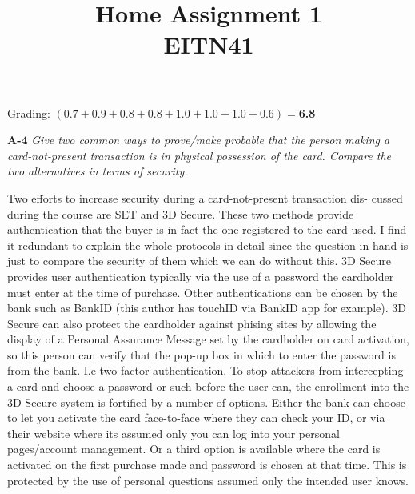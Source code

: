 \documentclass[a4paper]{article}
\title{Home Assignment 1 \\ EITN41}
\author{}
\date{}
\newcommand{\Q}[2]{
  \vspace{10pt} \textbf{#1} \textit{#2}
 }
\newcommand{\A}[1]{ #1 }
\begin{document}
\maketitle

Grading: $(0.7+0.9+0.8+0.8+1.0+1.0+1.0+0.6)=$\textbf{6.8}

\Q{A-4} {
  Give two common ways to prove/make probable that the person making
  a card-not-present transaction is in physical possession of the card. Compare
  the two alternatives in terms of security.
}

\A{
  Two efforts to increase security during a card-not-present transaction dis-
  cussed during the course are SET and 3D Secure. These two methods provide
  authentication that the buyer is in fact the one registered to the card used.
  I find it redundant to explain the whole protocols in detail since the question
  in hand is just to compare the security of them which we can do without this.
  3D Secure provides user authentication typically via the use of a password
  the cardholder must enter at the time of purchase. Other authentications can be
  chosen by the bank such as BankID (this author has touchID via BankID app
  for example). 3D Secure can also protect the cardholder against phising sites
  by allowing the display of a Personal Assurance Message set by the cardholder
  on card activation, so this person can verify that the pop-up box in which to
  enter the password is from the bank. I.e two factor authentication. To stop
  attackers from intercepting a card and choose a password or such before the
  user can, the enrollment into the 3D Secure system is fortified by a number of
  options. Either the bank can choose to let you activate the card face-to-face
  where they can check your ID, or via their website where its assumed only you
  can log into your personal pages/account management. Or a third option is
  available where the card is activated on the first purchase made and password is
  chosen at that time. This is protected by the use of personal questions assumed
  only the intended user knows.

}
\end{document}
